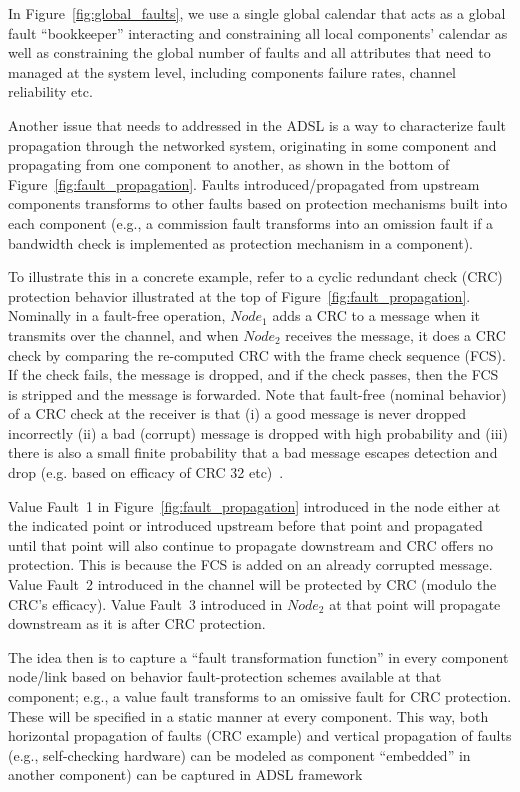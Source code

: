 In Figure~\ref{fig:global_faults}, we use a single global calendar that acts as
a global fault ``bookkeeper'' interacting and constraining all local components'
calendar as well as constraining the global number of faults and all attributes
that need to managed at the system level, including components failure rates,
channel reliability etc.

Another issue that needs to addressed in the ADSL is a way to characterize fault
propagation through the networked system, originating in some component and
propagating from one component to another, as shown in the bottom of
Figure~\ref{fig:fault_propagation}. Faults introduced/propagated from upstream
components transforms to other faults based on protection mechanisms built into
each component (e.g., a commission fault transforms into an omission fault if a
bandwidth check is implemented as protection mechanism in a component).

To illustrate this in a concrete example, refer to a cyclic redundant check
(CRC) protection behavior illustrated at the top of
Figure~\ref{fig:fault_propagation}. Nominally in a fault-free operation,
$Node_1$ adds a CRC to a message when it transmits over the channel, and when
$Node_2$ receives the message, it does a CRC check by comparing the re-computed CRC
with the frame check sequence (FCS). If the check fails, the message is dropped, and if the check
passes, then the FCS is stripped and the message is forwarded. Note that fault-free
(nominal behavior) of a CRC check at the receiver is that (i) a good message is
never dropped incorrectly (ii) a bad (corrupt) message is dropped with high
probability and (iii) there is also a small finite probability that a bad
message escapes detection and drop (e.g. based on efficacy of CRC 32 etc)~\cite{crc}.

Value Fault~1 in Figure~\ref{fig:fault_propagation} introduced in the node
either at the indicated point or introduced upstream before that point and
propagated until that point will also continue to propagate downstream and CRC
offers no protection. This is because the FCS is added on an already corrupted
message. Value Fault~2 introduced in the channel will be protected by CRC
(modulo the CRC's efficacy). Value Fault~3 introduced in $Node_2$ at that point will
propagate downstream as it is after CRC protection.

The idea then is to capture a “fault transformation function” in every component
node/link based on behavior fault-protection schemes available at that component;
e.g., a value fault transforms to an omissive fault for CRC protection.  These will be
specified in a static manner at every component. This way, both horizontal
propagation of faults (CRC example) and vertical propagation of faults
(e.g., self-checking hardware) can be modeled as component “embedded” in another
component) can be captured in ADSL framework


